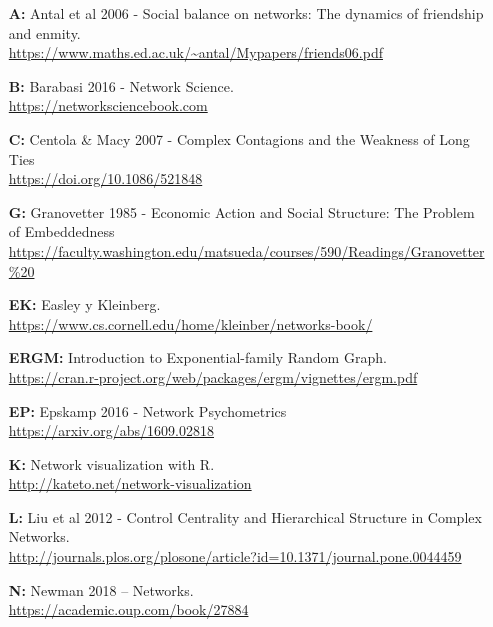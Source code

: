 \documentclass[12pt]{article}
\begin{document}
\begin{itemize}
    \item[\textbf{A:}] Antal et al 2006 - Social balance on networks: The dynamics of friendship and enmity. \\ \href{https://www.maths.ed.ac.uk/~antal/Mypapers/friends06.pdf}{https://www.maths.ed.ac.uk/\textasciitilde antal/Mypapers/friends06.pdf}
    \item[\textbf{B:}] Barabasi 2016 - Network Science. \\
    \href{https://networksciencebook.com}{https://networksciencebook.com}
    \item[\textbf{C:}] Centola \& Macy 2007 - Complex Contagions and the Weakness of Long Ties \\
    \href{https://doi.org/10.1086/521848}{https://doi.org/10.1086/521848}
    \item[\textbf{G:}] Granovetter 1985 - Economic Action and Social Structure: The Problem of Embeddedness \\ \href{https://faculty.washington.edu/matsueda/courses/590/Readings/Granovetter\%20Embeddedness\%20AJS.pdf}{https://faculty.washington.edu/matsueda/courses/590/Readings/Granovetter\%20}
    \item[\textbf{EK:}] Easley y Kleinberg. \\ \href{https://www.cs.cornell.edu/home/kleinber/networks-book/}{https://www.cs.cornell.edu/home/kleinber/networks-book/}
    \item[\textbf{ERGM:}] Introduction to Exponential-family Random Graph. \\
    \href{https://cran.r-project.org/web/packages/ergm/vignettes/ergm.pdf}{https://cran.r-project.org/web/packages/ergm/vignettes/ergm.pdf}
    \item[\textbf{EP:}] Epskamp 2016 - Network Psychometrics \\ 
    \href{https://arxiv.org/abs/1609.02818}{https://arxiv.org/abs/1609.02818}
    \item[\textbf{K:}] Network visualization with R. \\
    \href{http://kateto.net/network-visualization}{http://kateto.net/network-visualization}
    \item[\textbf{L:}] Liu et al 2012 - Control Centrality and Hierarchical Structure in Complex Networks. \\ 
    \href{http://journals.plos.org/plosone/article?id=10.1371/journal.pone.0044459}{http://journals.plos.org/plosone/article?id=10.1371/journal.pone.0044459}
    \item[\textbf{N:}] Newman 2018 – Networks. \\ \href{https://academic.oup.com/book/27884}{https://academic.oup.com/book/27884}

\end{itemize}
\end{document}
